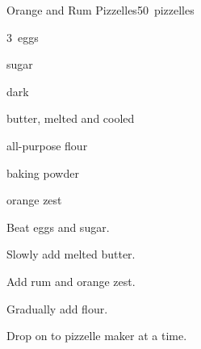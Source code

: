 \begin{recipe}{Orange and Rum Pizzelles}{}{50~pizzelles}

\begin{ingredients}
\item 3~eggs
\item {} sugar
\item {} dark 
\item \C{\half} butter, melted and cooled
\item {} all-purpose flour
\item {} baking powder
\item {} orange zest
\end{ingredients}

\begin{directions}
\item Beat eggs and sugar.
\item Slowly add melted butter.
\item Add rum and orange zest.
\item Gradually add flour.
\item Drop on to pizzelle maker  at a time.
\end{directions}

\end{recipe}
